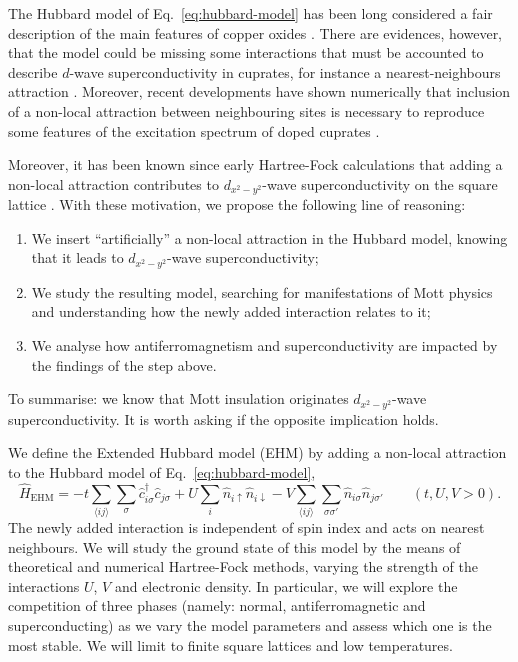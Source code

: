 The Hubbard model of Eq.~\eqref{eq:hubbard-model} has been long considered a fair description of the main features of copper oxides \cite{scalapino2012common}. There are evidences, however, that the model could be missing some interactions that must be accounted to describe $d$-wave superconductivity in cuprates, for instance a nearest-neighbours attraction \cite{jiang2022enhancing}. Moreover, recent developments have shown numerically that inclusion of a non-local attraction between neighbouring sites is necessary to reproduce some features of the excitation spectrum of doped cuprates \cite{padma2025beyond}.

Moreover, it has been known since early Hartree-Fock calculations that adding a non-local attraction contributes to $d_{x^2-y^2}$-wave superconductivity on the square lattice \cite{micnas1990superconductivity}. With these motivation, we propose the following line of reasoning:
\begin{enumerate}
	\item We insert ``artificially'' a non-local attraction in the Hubbard model, knowing that it leads to $d_{x^2-y^2}$-wave superconductivity;
	\item We study the resulting model, searching for manifestations of Mott physics and understanding how the newly added interaction relates to it;
	\item We analyse how antiferromagnetism and superconductivity are impacted by the findings of the step above.
\end{enumerate}
To summarise: we know that Mott insulation originates $d_{x^2-y^2}$-wave superconductivity. It is worth asking if the opposite implication holds.

We define the Extended Hubbard model (EHM) by adding a non-local attraction to the Hubbard model of Eq.~\eqref{eq:hubbard-model},
\begin{equation}\label{eq:extended-hubbard-model}
	\hat H_\mathrm{EHM} =
	-t \sum_{\langle ij \rangle} \sum_\sigma \hat c_{i\sigma}^\dagger \hat c_{j\sigma}
	+ U \sum_i \hat n_{i\uparrow} \hat n_{i\downarrow}
	- V \sum_{\langle ij \rangle} \sum_{\sigma \sigma'} \hat n_{i\sigma} \hat n_{j\sigma'}
	\qquad
	(t, U, V > 0).
\end{equation}
The newly added interaction is independent of spin index and acts on nearest neighbours. We will study the ground state of this model by the means of theoretical and numerical Hartree-Fock methods, varying the strength of the interactions $U$, $V$ and electronic density. In particular, we will explore the competition of three phases (namely: normal, antiferromagnetic and superconducting) as we vary the model parameters and assess which one is the most stable. We will limit to finite square lattices and low temperatures.

